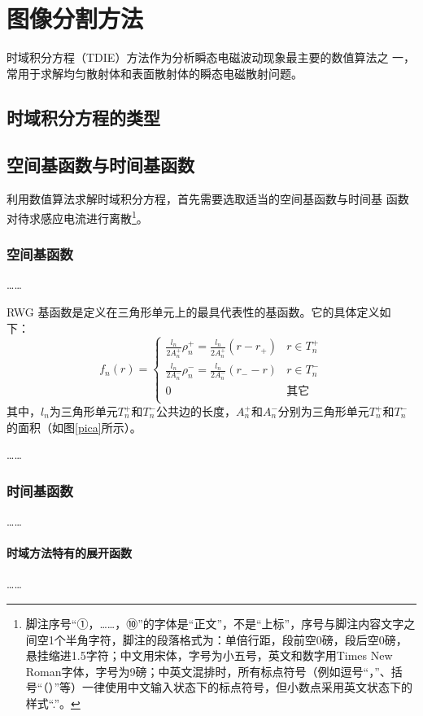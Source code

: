 
\chapter{图像分割方法}
时域积分方程（TDIE）方法作为分析瞬态电磁波动现象最主要的数值算法之
一，常用于求解均匀散射体和表面散射体的瞬态电磁散射问题。
\section{时域积分方程的类型}
\section{空间基函数与时间基函数}
利用数值算法求解时域积分方程，首先需要选取适当的空间基函数与时间基
函数对待求感应电流进行离散\footnote{脚注序号“①，……，⑩”的字体是“正文”，不是“上标”，序号与脚注内容文字之间空1个半角字符，脚注的段落格式为：单倍行距，段前空0磅，段后空0磅，悬挂缩进1.5字符；中文用宋体，字号为小五号，英文和数字用Times New Roman字体，字号为9磅；中英文混排时，所有标点符号（例如逗号“，”、括号“（）”等）一律使用中文输入状态下的标点符号，但小数点采用英文状态下的样式“.”。}。
\subsection{空间基函数}
……

RWG 基函数是定义在三角形单元上的最具代表性的基函数。它的具体定义如
下：
\begin{equation}
f_n(r)=
\begin{cases}
\frac{l_n}{2A_n^+}\rho_n^+=\frac{l_n}{2A_n^+}(r-r_+)&r\in T_n^+\\
\frac{l_n}{2A_n^-}\rho_n^-=\frac{l_n}{2A_n^-}(r_--r)&r\in T_n^-\\
0&\text{其它}\\
\end{cases}
\end{equation}
其中，$l_n$为三角形单元$T_n^+$和$T_n^-$公共边的长度，$A_n^+$和$A_n^-$分别为三角形单元$T_n^+$和$T_n^-$的面积（如图\ref{pica}所示）。

……

\subsection{时间基函数}
……
\subsubsection{时域方法特有的展开函数}
……
